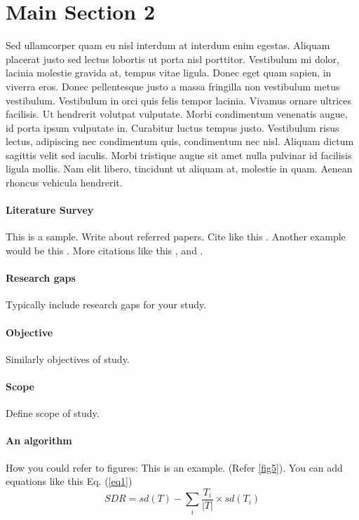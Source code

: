 
\section{Main Section 2}

Sed ullamcorper quam eu nisl interdum at interdum enim egestas. Aliquam placerat justo sed lectus lobortis ut porta nisl porttitor. Vestibulum mi dolor, lacinia molestie gravida at, tempus vitae ligula. Donec eget quam sapien, in viverra eros. Donec pellentesque justo a massa fringilla non vestibulum metus vestibulum. Vestibulum in orci quis felis tempor lacinia. Vivamus ornare ultrices facilisis. Ut hendrerit volutpat vulputate. Morbi condimentum venenatis augue, id porta ipsum vulputate in. Curabitur luctus tempus justo. Vestibulum risus lectus, adipiscing nec condimentum quis, condimentum nec nisl. Aliquam dictum sagittis velit sed iaculis. Morbi tristique augue sit amet nulla pulvinar id facilisis ligula mollis. Nam elit libero, tincidunt ut aliquam at, molestie in quam. Aenean rhoncus vehicula hendrerit.


\paragraph{Literature Survey}

This is a sample. Write about referred papers. Cite like this \citep{nip2010cyclic}. Another example would be this \citep{nip2010extremely}. More citations like this \citep{bird2004evaluating}, \citep {tremblay2003seismic} and \citep {alhamaydeh2016key}.

\paragraph{Research gaps}
Typically include research gaps for your study. 
\paragraph{Objective}
Similarly objectives of study. 
\paragraph{Scope}
Define scope of study. 
\paragraph{An algorithm}
How you could refer to figures: This is an example. (Refer \ref{fig5}). You can add equations like this Eq. (\ref{eq1})
\begin{equation}
\label{eq1}
  SDR = sd(T) - \sum_{i}\frac{{T}_{i}}{|T|}\times sd({T}_{i})
\end{equation}

